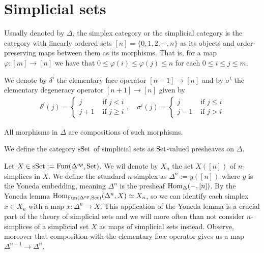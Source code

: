 \documentclass[../thesis.tex]{subfiles}
\begin{document}
\section{Simplicial sets}
\begin{definition}
    Usually denoted by $\Delta$, the simplex category or the simplicial category is the category with linearly ordered sets $[n]=\{0,1,2,\cdots ,n\}$ as its objects and order-preserving maps between them as its morphisms.
    That is, for a map $\varphi:[m] \to [n]$ we have that $0 \leq \varphi(i)\leq \varphi(j)\leq n$ for each $0 \leq i \leq j \leq m$.
\end{definition}
We denote by $\delta^i$ the elementary face operator $[n-1] \to [n]$ and by $\sigma^i$ the elementary degeneracy operator $[n+1] \to [n]$ given by
\[
    \begin{aligned}
        \delta^i(j) =
        \begin{cases}
            j   & \text{ if } j < i    \\
            j+1 & \text{ if } j \geq i
        \end{cases}, \quad
        \sigma^i(j) =
        \begin{cases}
            j   & \text{ if } j \leq i \\
            j-1 & \text{ if } j > i
        \end{cases}
    \end{aligned}
\]
\begin{remark}
    All morphisms in $\Delta$ are compositions of such morphisms.
\end{remark}
\begin{definition}
    We define the category $\mathrm{sSet}$ of simplicial sets as $\mathrm{Set}$-valued presheaves on $\Delta$.
\end{definition}
Let $X \in \mathrm{sSet} : = \mathrm{Fun}(\Delta^{op}, \mathrm{Set})$. We wil denote by $X_n$ the set $X([n])$ of $n$-simplices in $X$.
We define the standard $n$-simplex as $\Delta^n:=y([n])$ where $y$ is the Yoneda embedding, meaning $\Delta^n$ is the presheaf $\mathrm{Hom}_{\Delta}({-},[n])$.
By the Yoneda lemma $\mathrm{Hom}_{\mathrm{Fun}(\Delta^{op}, \mathrm{Set})}(\Delta^n, X) \simeq X_n$, so we can identify each simplex $x\in X_n$ with a map $x:\Delta^n\to X$.
This application of the Yoneda lemma is a crucial part of the theory of simplicial sets and we will more often than not consider $n$-simplices of a simplicial set $X$ as maps of simplicial sets instead.
Observe, moreover that composition with the elementary face operator gives us a map $\Delta^{n-1}\to\Delta^n$.
\end{document}
